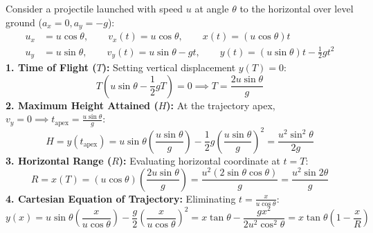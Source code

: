 \documentclass[10pt,a4paper]{article}
\begin{document}
\begin{formulabox}
Consider a projectile launched with speed $u$ at angle $\theta$ to the horizontal over level ground ($a_x = 0, a_y = -g$):
\begin{align}
  u_x &= u\cos\theta, \qquad v_x(t) = u\cos\theta, \qquad x(t) = (u\cos\theta)t \\
  u_y &= u\sin\theta, \qquad v_y(t) = u\sin\theta - gt, \qquad y(t) = (u\sin\theta)t - \frac{1}{2}gt^2
\end{align}
\textbf{1. Time of Flight ($T$):} Setting vertical displacement $y(T) = 0$:
\begin{equation}
  T\left(u\sin\theta - \frac{1}{2}gT\right) = 0 \implies T = \frac{2u\sin\theta}{g}
\end{equation}
\textbf{2. Maximum Height Attained ($H$):} At the trajectory apex, $v_y = 0 \implies t_{\text{apex}} = \frac{u\sin\theta}{g}$:
\begin{equation}
  H = y(t_{\text{apex}}) = u\sin\theta\left(\frac{u\sin\theta}{g}\right) - \frac{1}{2}g\left(\frac{u\sin\theta}{g}\right)^2 = \frac{u^2\sin^2\theta}{2g}
\end{equation}
\textbf{3. Horizontal Range ($R$):} Evaluating horizontal coordinate at $t = T$:
\begin{equation}
  R = x(T) = (u\cos\theta)\left(\frac{2u\sin\theta}{g}\right) = \frac{u^2(2\sin\theta\cos\theta)}{g} = \frac{u^2\sin 2\theta}{g}
\end{equation}
\textbf{4. Cartesian Equation of Trajectory:} Eliminating $t = \frac{x}{u\cos\theta}$:
\begin{equation}
  y(x) = u\sin\theta\left(\frac{x}{u\cos\theta}\right) - \frac{g}{2}\left(\frac{x}{u\cos\theta}\right)^2 = x\tan\theta - \frac{gx^2}{2u^2\cos^2\theta} = x\tan\theta\left(1 - \frac{x}{R}\right)
\end{equation}
\end{formulabox}
\end{document}
